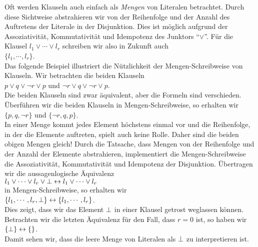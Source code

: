 Oft werden Klauseln auch einfach als \emph{Mengen} von Literalen betrachtet.  
Durch diese Sichtweise abstrahieren wir von der Reihenfolge und der Anzahl des Auftretens
der Literale in der Disjunktion.  Dies ist m\"{o}glich aufgrund der Assoziativit\"{a}t, Kommutativit\"{a}t und
Idempotenz des Junktors ``$\vee$''.  F\"{u}r die Klausel $l_1 \vee \cdots \vee l_r$ schreiben
wir also in Zukunft auch 
\\[0.2cm]
\hspace*{1.3cm} $\{ l_1, \cdots, l_r \}$.
\\[0.2cm]
Das folgende Beispiel illustriert die N\"{u}tzlichkeit der Mengen-Schreibweise von Klauseln.
Wir betrachten die beiden Klauseln
\\[0.2cm]
\hspace*{1.3cm}
$p \vee q \vee \neg r \vee p$ \quad und \quad $\neg r \vee q \vee \neg r \vee p$. 
\\[0.2cm]
Die beiden Klauseln sind zwar \"{a}quivalent, aber die Formeln sind verschieden.
\"{U}berf\"{u}hren wir die beiden Klauseln in Mengen-Schreibweise, so erhalten wir
\\[0.2cm]
\hspace*{1.3cm}
$\{p, q, \neg r \}$ \quad und \quad $\{ \neg r, q, p \}$. 
\\[0.2cm]
In einer Menge kommt jedes Element h\"{o}chstens einmal vor und die Reihenfolge, in der die
Elemente auftreten, spielt auch keine Rolle.  Daher sind die beiden obigen Mengen gleich!
Durch die Tatsache, dass Mengen von der Reihenfolge und der Anzahl der Elemente
abstrahieren, implementiert die Mengen-Schreibweise die Assoziativit\"{a}t, Kommutativit\"{a}t und
Idempotenz der Disjunktion.  \"{U}ber\-tragen wir die  aussagenlogische \"{A}quivalenz
\\[0.2cm]
\hspace*{1.3cm}
$l_1 \vee \cdots \vee l_r \vee \bot \leftrightarrow l_1 \vee \cdots \vee l_r$
\\[0.2cm]
in Mengen-Schreibweise, so erhalten wir
\\[0.2cm]
\hspace*{1.3cm}
$\{ l_1, \cdots, l_r, \bot \} \leftrightarrow \{ l_1, \cdots, l_r \}$.
\\[0.2cm]
Dies zeigt, dass wir das Element $\bot$ in einer Klausel getrost weglassen k\"{o}nnen.
Betrachten wir die letzten \"{A}quivalenz f\"{u}r den Fall, dass $r=0$ ist, so haben wir
\\[0.2cm]
\hspace*{1.3cm}
$\{\bot \} \leftrightarrow \{\}$.
\\[0.2cm]
Damit sehen wir, dass die leere Menge von Literalen als $\bot$ zu interpretieren ist.

